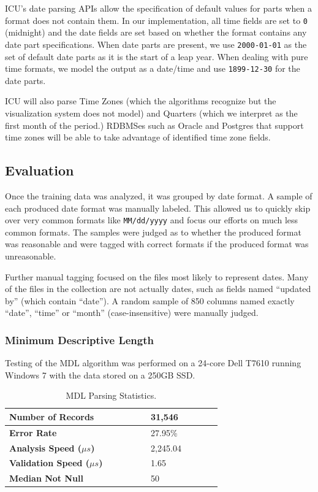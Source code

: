 ICU's date parsing APIs allow the specification of default values for parts when a format does not contain them. In our implementation, all time fields are set to \texttt{0} (midnight) and the date fields are set based on whether the format contains any date part specifications. When date parts are present, we use \texttt{2000-01-01} as the set of default date parts as it is the start of a leap year. When dealing with pure time formats, we model the output as a date/time and use \texttt{1899-12-30} for the date parts.

ICU will also parse Time Zones (which the algorithms recognize but the visualization system does not model) and Quarters (which we interpret as the first month of the period.) RDBMSes such as Oracle and Postgres that support time zones will be able to take advantage of  identified time zone fields.

\subsection{Evaluation}
Once the training data was analyzed, it was grouped by date format. A sample of each produced date format was manually labeled. This allowed us to quickly skip over very common formats like \texttt{MM/dd/yyyy} and focus our efforts on much less common formats. The samples were judged as to whether the produced format was reasonable and were tagged with correct formats if the produced format was unreasonable.

Further manual tagging focused on the files most likely to represent dates. Many of the files in the collection are not actually dates, such as fields named ``updated by'' (which contain ``date''). A random sample of 850 columns named exactly ``date'', ``time'' or ``month'' (case-insensitive) were manually judged.\\

\subsubsection{Minimum Descriptive Length}
Testing of the MDL algorithm was performed on a 24-core Dell T7610 running Windows 7 with the data stored on a 250GB SSD.

\begin{table}[ht]
\centering
\bgroup
\def\arraystretch{1.5}
\begin{tabular}{|p{0.48\linewidth}| p{0.24\linewidth}|}
\hline
\textbf{Number of Records} & 31,546\\ \hline
\textbf{Error Rate} & 27.95\% \\ \hline
\textbf{Analysis Speed ($\mu s$)} & 2,245.04 \\ \hline
\textbf{Validation Speed ($\mu s$)} & 1.65 \\ \hline
\textbf{Median Not Null} & 50 \\ \hline
\end{tabular}
\egroup
\label{tab:mdlstats}
\caption{MDL Parsing Statistics.}
\end{table}

